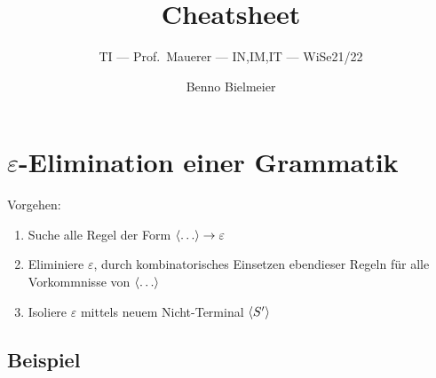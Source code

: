 \documentclass[a4paper,parskip=half,footsepline=on,headings=normal,titlepage=false]{scrartcl}
\title{Cheatsheet}
\subtitle{\acl{TI} --- Prof.~Mauerer --- IN,IM,IT --- \acs{WiSe}21/22}
\author{Benno Bielmeier}
\newcommand{\nt}[1]{\langle \uppercase{#1} \rangle}
\renewcommand{\epsilon}{\varepsilon}
\begin{document}

\begin{acronym}
\end{acronym}

\maketitle
\tableofcontents

\section{\texorpdfstring{$\epsilon$}{Epsilon}-Elimination einer Grammatik}
Vorgehen:
\begin{enumerate}[label=\alph*)]
    \item Suche alle Regel der Form {\color{c1}$\nt{\dots} \to \epsilon$}
    \item {\color{c2}Eliminiere $\epsilon$}, durch kombinatorisches Einsetzen ebendieser Regeln für alle Vorkommnisse von \textcolor{c1}{$\nt{\dots}$}
    \item {\color{c3}Isoliere $\epsilon$} mittels neuem Nicht-Terminal \textcolor{c3}{$\nt{S'}$}
\end{enumerate}

\subsection*{Beispiel}
\end{document}

